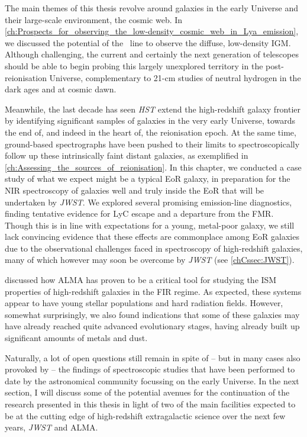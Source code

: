 The main themes of this thesis revolve around galaxies in the early Universe and their large-scale environment, the cosmic web. In \cref{ch:Prospects_for_observing_the_low-density_cosmic_web_in_Lya_emission}, we discussed the potential of the \lya\ line to observe the diffuse, low-density IGM. Although challenging, the current and certainly the next generation of telescopes should be able to begin probing this largely unexplored territory in the post-reionisation Universe, complementary to 21-cm studies of neutral hydrogen in the dark ages and at cosmic dawn.

Meanwhile, the last decade has seen \textit{HST} extend the high-redshift galaxy frontier by identifying significant samples of galaxies in the very early Universe, towards the end of, and indeed in the heart of, the reionisation epoch. At the same time, ground-based spectrographs have been pushed to their limits to spectroscopically follow up these intrinsically faint distant galaxies, as exemplified in \cref{ch:Assessing_the_sources_of_reionisation}. In this chapter, we conducted a case study of what we expect might be a typical EoR galaxy, in preparation for the NIR spectroscopy of galaxies well and truly inside the EoR that will be undertaken by \textit{JWST}. We explored several promising emission-line diagnostics, finding tentative evidence for LyC escape and a departure from the FMR. Though this is in line with expectations for a young, metal-poor galaxy, we still lack convincing evidence that these effects are commonplace among EoR galaxies due to the observational challenges faced in spectroscopy of high-redshift galaxies, many of which however may soon be overcome by \textit{JWST} (see \cref{chCssec:JWST}).

 discussed how ALMA has proven to be a critical tool for studying the ISM properties of high-redshift galaxies in the FIR regime. As expected, these systems appear to have young stellar populations and hard radiation fields. However, somewhat surprisingly, we also found indications that some of these galaxies may have already reached quite advanced evolutionary stages, having already built up significant amounts of metals and dust.

Naturally, a lot of open questions still remain in spite of -- but in many cases also provoked by -- the findings of spectroscopic studies that have been performed to date by the astronomical community focussing on the early Universe. In the next section, I will discuss some of the potential avenues for the continuation of the research presented in this thesis in light of two of the main facilities expected to be at the cutting edge of high-redshift extragalactic science over the next few years, \textit{JWST} and ALMA.

